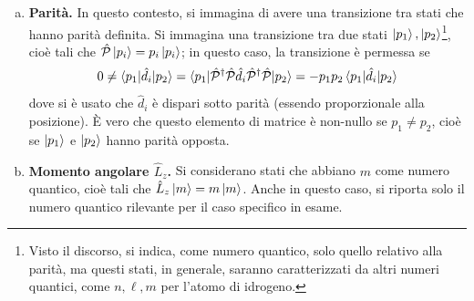 \documentclass[11pt, a4paper]{scrartcl} %
\numberwithin{equation}{subsection}
\theoremstyle{style2}
\theoremstyle{style1}
\begin{document}
\begin{enumerate}[(a).]
	\item {\sffamily \bfseries Parit\`a.}
		In questo contesto, si immagina di avere una transizione tra stati che hanno parit\`a definita.
		Si immagina una transizione tra due stati $\ket{p_1} , \ket{p_2} $\footnote{Visto il discorso, si indica, come numero quantico, solo quello relativo alla parit\`a, ma questi stati, in generale, saranno caratterizzati da altri numeri quantici, come $n,\ell ,m$ per l'atomo di idrogeno.}, cio\`e tali che $\hat{\mathcal{P} }\ket{p_i} = p_i \ket{p_i}$; in questo caso, la transizione \`e permessa se
		\[
		0\neq\braket{p_1|\hat{d}_i|p_2} =\braket{p_1|\hat{\mathcal{P} }^\dagger \hat{\mathcal{P} } \hat{d}_i \hat{\mathcal{P} }^\dagger  \hat{\mathcal{P} }|p_2} = - p_1p_2 \braket{p_1|\hat{d}_i|p_2} 
		\] 
	dove si \`e usato che $\hat{d}_i$ \`e dispari sotto parit\`a (essendo proporzionale alla posizione).	
	\`E vero che questo elemento di matrice \`e non-nullo se $p_1\neq p_2$, cio\`e se $\ket{p_1} $ e $\ket{p_2} $ hanno parit\`a opposta.
	\item {\sffamily \bfseries Momento angolare $\hat{L}_z$.}
		Si considerano stati che abbiano $m$ come numero quantico, cio\`e tali che $\hat{L}_z \ket{m} = m \ket{m} $. 
		Anche in questo caso, si riporta solo il numero quantico rilevante per il caso specifico in esame.


\end{enumerate}
\end{document}
